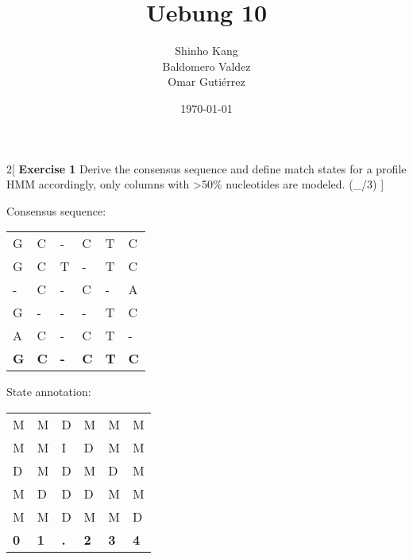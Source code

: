 \documentclass[a4paper]{article}
\title{Uebung 10}
\author{Shinho Kang\\Baldomero Valdez\\Omar Guti\'errez}
\date{\today}
\begin{document}
\maketitle

\begin{multicols}{2}[
\textbf{Exercise 1} Derive the consensus sequence and define match states for a
profile HMM accordingly, only columns with >50\% nucleotides are modeled.
(\_/3)
]

Consensus sequence:

\begin{tabular}{ l l l l l l}
G & C & - & C & T & C \\
G & C & T & - & T & C \\
- & C & - & C & - & A \\
G & - & - & - & T & C \\
A & C & - & C & T & - \\ \hline
\textbf{G} & \textbf{C} & \textbf{-} & \textbf{C} & \textbf{T} & \textbf{C}
\end{tabular}

State annotation:

\begin{tabular}{ l l l l l l}
M & M & D & M & M & M \\
M & M & I & D & M & M \\
D & M & D & M & D & M \\
M & D & D & D & M & M \\
M & M & D & M & M & D \\ \hline
\textbf{0} & \textbf{1} & \textbf{.} & \textbf{2} & \textbf{3} & \textbf{4}
\end{tabular}

\end{multicols}



\end{document}
